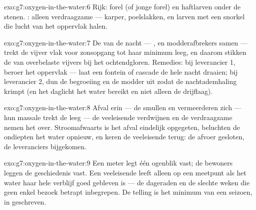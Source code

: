 \begin{solution}{exo:g7:oxygen-in-the-water:6}
Rijk: forel (of jonge forel) en haftlarven onder de stenen. : alleen
verdraagzame  --- karper, poelslakken, en larven met een snorkel
die lucht van het oppervlak halen.
\end{solution}

\begin{solution}{exo:g7:oxygen-in-the-water:7}
De  van de nacht --- ,  en modderafbrekers samen
--- trekt de vijver vlak voor zonsopgang tot haar minimum leeg, en daarom
stikken de  van overbelaste vijvers bij het ochtendgloren.
Remedies: bij leverancier 1, beroer het oppervlak --- laat een fontein of
cascade de hele nacht draaien; bij leverancier 2, dun de begroeiing en de
modder uit zodat de nachtademhaling krimpt (en het daglicht het water
bereikt en niet alleen de drijflaag).
\end{solution}

\begin{solution}{exo:g7:oxygen-in-the-water:8}
Afval erin --- de  smullen en vermeerderen zich --- hun massale
 trekt de  leeg --- de veeleisende  verdwijnen
en de verdraagzame nemen het over. Stroomafwaarts is het afval eindelijk
opgegeten, beluchten de ondiepten het water opnieuw, en keren de
veeleisende  terug: de afvoer gesloten, de leveranciers bijgekomen.
\end{solution}

\begin{solution}{exo:g7:oxygen-in-the-water:9}
Een meter legt één ogenblik vast; de bewoners leggen de geschiedenis vast.
Een veeleisende  leeft alleen op een meetpunt als het water haar hele
verblijf goed gebleven is --- de dageraden en de slechte weken die geen
enkel bezoek betrapt inbegrepen. De telling is het minimum van een
seizoen, in  geschreven.
\end{solution}

